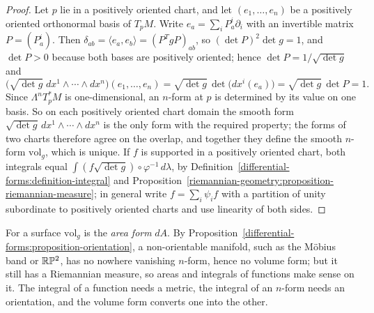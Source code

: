 \begin{proof}
Let $p$ lie in a positively oriented chart, and let $(e_1, \ldots, e_n)$ be a positively oriented orthonormal basis of $T_pM$. Write $e_a = \sum_iP^i_a\partial_i$ with an
invertible matrix $P = (P^i_a)$. Then $\delta_{ab} = \langle e_a, e_b\rangle = (P^TgP)_{ab}$, so $(\det P)^2\det g = 1$, and $\det P > 0$ because both bases are
positively oriented; hence $\det P = 1/\sqrt{\det g}$ and
\[
\bigl(\sqrt{\det g}\;dx^1 \wedge \cdots \wedge dx^n\bigr)(e_1, \ldots, e_n) = \sqrt{\det g}\,\det\bigl(dx^i(e_a)\bigr) = \sqrt{\det g}\,\det P = 1 .
\]
Since $\Lambda^nT^*_pM$ is one-dimensional, an $n$-form at $p$ is determined by its value on one basis. So on each positively oriented chart domain the smooth form
$\sqrt{\det g}\,dx^1 \wedge \cdots \wedge dx^n$ is the only form with the required property; the forms of two charts therefore agree on the overlap, and together they
define the smooth $n$-form $\mathrm{vol}_g$, which is unique. If $f$ is supported in a positively oriented chart, both integrals equal
$\int(f\sqrt{\det g}) \circ \varphi^{-1}\,d\lambda$, by Definition~\ref{differential-forms:definition-integral} and
Proposition~\ref{riemannian-geometry:proposition-riemannian-measure}; in general write $f = \sum_i\psi_if$ with a partition of unity subordinate to positively oriented
charts and use linearity of both sides.
\end{proof}

For a surface $\mathrm{vol}_g$ is the \emph{area form} $dA$. By Proposition~\ref{differential-forms:proposition-orientation}, a non-orientable manifold, such as the
M\"obius band or $\mathbb{R}\mathbb{P}^2$, has no nowhere vanishing $n$-form, hence no volume form; but it still has a Riemannian measure, so areas and integrals of functions make sense
on it. The integral of a function needs a metric, the integral of an $n$-form needs an orientation, and the volume form converts one into the other.

